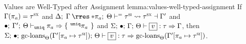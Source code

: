 \begin{oxlemma}{Values are Well-Typed after Assignment}
  {lemma:values-well-typed-assignment}
  If $\Gamma(\pi_a) = \tau^\textsc{sx}$ and
  $\oxtunify[\oxnoop]{\oxtvarctx}{\oxkontctx}{
    \oxrsub{\oxvarctx}{\oxderef{\oxplace_a}}
  }{\oxsitype}{\oxsxtype}{\oxvarctx^\prime}$ and
  $\bullet; \: \Gamma^\prime; \: \Theta \vdash_{\mathtt{uniq}} \pi_a \Rightarrow 
    \{ \: \,^{\mathtt{uniq}}\pi_a\, \: \}
  $ and
  $\oxtypjudge{\oxglobalctx}{\oxemptyctx}{\oxkontctx}{\oxvarctx}
  {\oxvalue}{\oxtype}{\oxvarctx}$, then
  $\oxtypjudge{\oxglobalctx}{\oxemptyctx}{\oxkontctx}{
    \oxgcloans{\oxkontctx}{\oxtupdate{\oxvarctx^\prime}{\oxplace_a}{\oxsitype}}
  }{
    \oxvalue
  }{\oxtype}{
    \oxgcloans{\oxkontctx}{\oxtupdate{\oxvarctx^\prime}{\oxplace_a}{\oxsitype}}
  }$.
\end{oxlemma}

